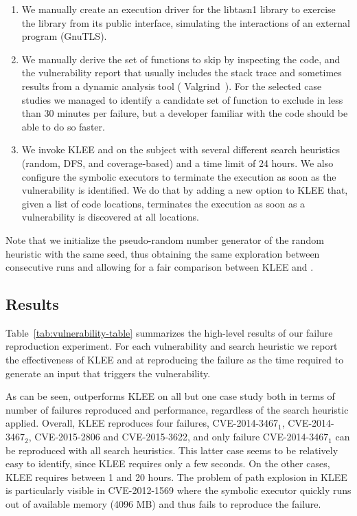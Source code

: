 \begin{enumerate}[leftmargin=*]
\item We manually create an execution driver for the \textsf{libtasn1}
  library to exercise the library from its public interface,
  simulating the interactions of an external program (\eg GnuTLS).
\item We manually derive the set of functions to skip by inspecting
  the code, and the vulnerability report that usually includes the
  stack trace and sometimes results from a dynamic analysis tool (\eg
  Valgrind~\cite{valgrind2003}). For the selected case studies we
  managed to identify a candidate set of function to exclude in less
  than 30 minutes per failure, but a developer familiar with the code
  should be able to do so faster.
\item We invoke KLEE and \toolname on the subject with several
  different search heuristics (random, DFS, and coverage-based) and a
  time limit of 24 hours. We also configure the symbolic executors to
  terminate the execution as soon as the vulnerability is
  identified. We do that by adding a new option to KLEE that, given a
  list of code locations, terminates the execution as soon as a
  vulnerability is discovered at all locations.
\end{enumerate}

Note that we initialize the pseudo-random number generator of the
random heuristic with the same seed, thus obtaining the same
exploration between consecutive runs and allowing for a fair
comparison between KLEE and \toolname.

\subsection{Results}
Table~\ref{tab:vulnerability-table} summarizes the high-level results
of our failure reproduction experiment. For each vulnerability and
search heuristic we report the effectiveness of KLEE and \toolname at
reproducing the failure as the time required to generate an input that
triggers the vulnerability.

As can be seen, \toolname outperforms KLEE on all but one case study
both in terms of number of failures reproduced and performance,
regardless of the search heuristic applied. Overall, KLEE reproduces
four failures, CVE-2014-3467$_1$, CVE-2014-3467$_2$, CVE-2015-2806 and
CVE-2015-3622, and only failure CVE-2014-3467$_1$ can be reproduced
with all search heuristics. This latter case seems to be relatively
easy to identify, since KLEE requires only a few seconds. On the other
cases, KLEE requires between 1 and 20 hours. The problem of path
explosion in KLEE is particularly visible in CVE-2012-1569 where the
symbolic executor quickly runs out of available memory (4096 MB) and
thus fails to reproduce the failure.

